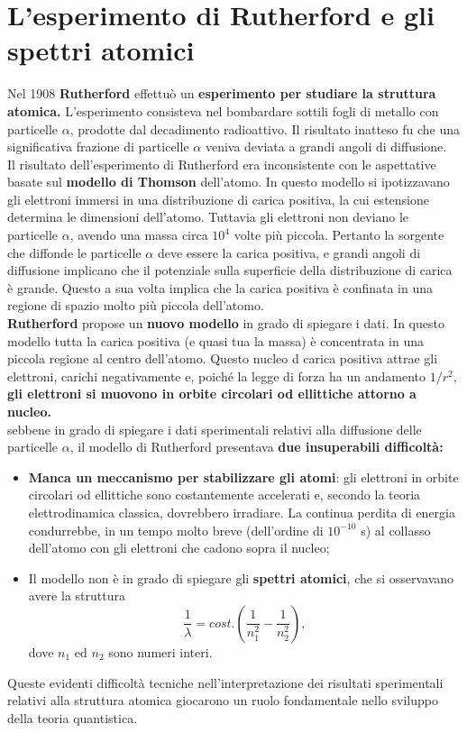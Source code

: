 \documentclass[a4paper,12pt,oneside]{book}
\begin{document}
\section{L'esperimento di Rutherford e gli spettri atomici}
Nel 1908 \textbf{Rutherford} effettuò un \textbf{esperimento per studiare la struttura atomica.} L'esperimento consisteva nel bombardare sottili fogli di metallo con particelle $\alpha$, prodotte dal decadimento radioattivo. Il risultato inatteso fu che una significativa frazione di particelle $\alpha$ veniva deviata a grandi angoli di diffusione.\\
Il risultato dell'esperimento di Rutherford era inconsistente con le aspettative basate sul \textbf{modello di Thomson} dell'atomo. In questo modello si ipotizzavano gli elettroni immersi in una distribuzione di carica positiva, la cui estensione determina le dimensioni dell'atomo. Tuttavia gli elettroni non deviano le particelle $\alpha$, avendo una massa circa $10^4$ volte più piccola. Pertanto la sorgente che diffonde le particelle $\alpha$ deve essere la carica positiva, e grandi angoli di diffusione implicano che il potenziale sulla superficie della distribuzione di carica è grande. Questo a sua volta implica che la carica positiva è confinata in una regione di spazio molto più piccola dell'atomo.\\
\textbf{Rutherford} propose un \textbf{nuovo modello} in grado di spiegare i dati. In questo modello tutta la carica positiva (e quasi tua la massa) è concentrata in una piccola regione al centro dell'atomo. Questo nucleo d carica positiva attrae gli elettroni, carichi negativamente e, poiché la legge di forza ha un andamento $1/r^2$, \textbf{gli elettroni si muovono in orbite circolari od ellittiche attorno a nucleo.}\\
sebbene in grado di spiegare i dati sperimentali relativi alla diffusione delle particelle $\alpha$, il modello di Rutherford presentava \textbf{due insuperabili difficoltà:}
\begin{itemize}
\item \textbf{Manca un meccanismo per stabilizzare gli atomi}: gli elettroni in orbite circolari od ellittiche sono costantemente accelerati e, secondo la teoria elettrodinamica classica, dovrebbero irradiare. La continua perdita di energia condurrebbe, in un tempo molto breve (dell'ordine di $10^{-10}$ s) al collasso dell'atomo con gli elettroni che cadono sopra il nucleo;
\item Il modello non è in grado di spiegare gli \textbf{spettri atomici}, che si osservavano avere la struttura
\begin{equation}
\frac{1}{\lambda} = cost. \left( \frac{1}{n_1 ^2}-\frac{1}{n_2 ^2} \right),
\end{equation}
dove $n_1$ ed $n_2$ sono numeri interi.
\end{itemize}
Queste evidenti difficoltà tecniche nell'interpretazione dei risultati sperimentali relativi alla struttura atomica giocarono un ruolo fondamentale nello sviluppo della teoria quantistica.
\end{document}
